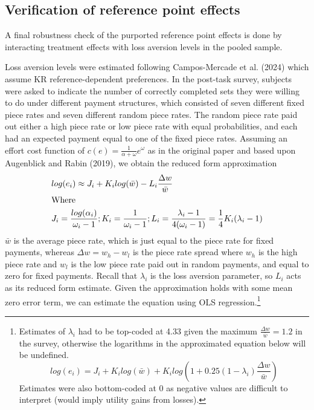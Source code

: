 \documentclass[
  12,
  letterpaper,
  DIV=11,
  numbers=noendperiod]{scrartcl}
\begin{document}
\subsection{Verification of reference point
effects}\label{verification-of-reference-point-effects}

A final robustness check of the purported reference point effects is
done by interacting treatment effects with loss aversion levels in the
pooled sample.

Loss aversion levels were estimated following Campos-Mercade et al.
(2024) which assume KR reference-dependent preferences. In the post-task
survey, subjects were asked to indicate the number of correctly
completed sets they were willing to do under different payment
structures, which consisted of seven different fixed piece rates and
seven different random piece rates. The random piece rate paid out
either a high piece rate or low piece rate with equal probabilities, and
each had an expected payment equal to one of the fixed piece rates.
Assuming an effort cost function of
\(c(e) = \frac {1}{\alpha + \omega} e^\omega\) as in the original paper
and based upon Augenblick and Rabin (2019), we obtain the reduced form
approximation \[
\begin{aligned}
& log(e_i) \approx J_i + K_i log(\bar{w}) - L_i \frac{\Delta w}{\bar w} \\
& \text{Where} \\
& J_i = \frac {log(\alpha_i)}{\omega_i - 1}; \space K_i = \frac {1}{\omega_i - 1}; \space L_i = \frac {\lambda_i -1}{4(\omega_i - 1)} = \frac {1}{4} K_i (\lambda_i -1) 
\end{aligned}
\] \(\bar w\) is the average piece rate, which is just equal to the
piece rate for fixed payments, whereas \(\Delta w = w_h - w_l\) is the
piece rate spread where \(w_h\) is the high piece rate and \(w_l\) is
the low piece rate paid out in random payments, and equal to zero for
fixed payments. Recall that \(\lambda_i\) is the loss aversion
parameter, so \(L_i\) acts as its reduced form estimate. Given the
approximation holds with some mean zero error term, we can estimate the
equation using OLS regression.\footnote{Estimates of \(\lambda_i\) had
  to be top-coded at 4.33 given the maximum
  \(\frac{\Delta w}{\bar w} = 1.2\) in the survey, otherwise the
  logarithms in the approximated equation below will be undefined. \[
  log(e_i) = J_i + K_i log(\bar{w}) + K_i log(1 + 0.25 (1 - \lambda_i) \frac{\Delta w}{\bar w})
  \] Estimates were also bottom-coded at 0 as negative values are
  difficult to interpret (would imply utility gains from losses).}
\end{document}
